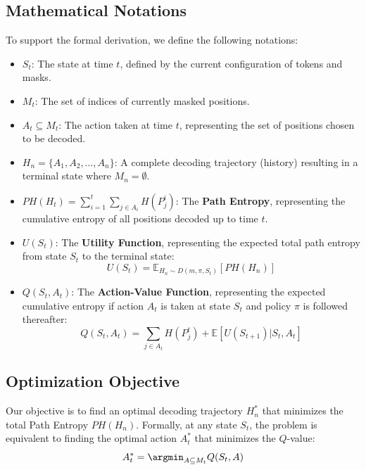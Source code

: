 \subsection*{Mathematical Notations}

To support the formal derivation, we define the following notations:

\begin{itemize}
    \item $S_t$: The state at time $t$, defined by the current configuration of tokens and masks.
    \item $M_t$: The set of indices of currently masked positions.
    \item $A_t \subseteq M_t$: The action taken at time $t$, representing the set of positions chosen to be decoded.
    \item $H_n = \{A_1, A_2, \dots, A_n\}$: A complete decoding trajectory (history) resulting in a terminal state where $M_n = \emptyset$.
    \item $PH(H_t) = \sum_{i=1}^t \sum_{j \in A_i} H(P_j^i)$: The \textbf{Path Entropy}, representing the cumulative entropy of all positions decoded up to time $t$.
    \item $U(S_t)$: The \textbf{Utility Function}, representing the expected total path entropy from state $S_t$ to the terminal state:
    \begin{equation}
        U(S_t) = \mathbb{E}_{H_n \sim D(m,\pi,S_t)} [PH(H_n)]
    \end{equation}
    \item $Q(S_t, A_t)$: The \textbf{Action-Value Function}, representing the expected cumulative entropy if action $A_t$ is taken at state $S_t$ and policy $\pi$ is followed thereafter:
    \begin{equation}
        Q(S_t, A_t) = \sum_{j \in A_t} H(P_j^t) + \mathbb{E}[U(S_{t+1}) | S_t, A_t]
    \end{equation}
\end{itemize}

\subsection{Optimization Objective}
Our objective is to find an optimal decoding trajectory $H_n^*$ that minimizes the total Path Entropy $PH(H_n)$. Formally, at any state $S_t$, the problem is equivalent to finding the optimal action $A_t^*$ that minimizes the $Q$-value:
\begin{equation}
    A_t^* = \argmin_{A \subseteq M_t} Q(S_t, A)
\end{equation}

